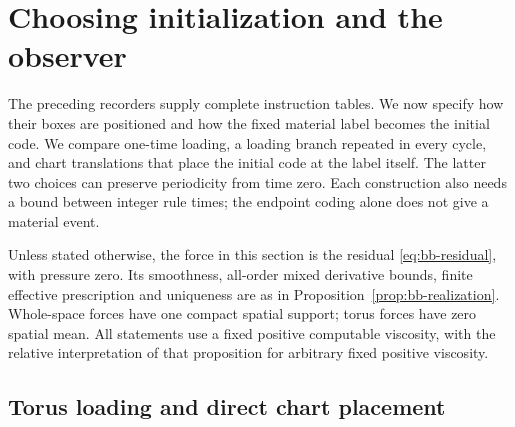 \section{Choosing initialization and the observer}
\label{sec:bb-initialization}

The preceding recorders supply complete instruction tables. We now
specify how their boxes are positioned and how the fixed material label
becomes the initial code. We compare one-time loading, a loading branch
repeated in every cycle, and chart translations that place the initial
code at the label itself. The latter two choices can preserve periodicity
from time zero. Each construction also needs a bound between integer
rule times; the endpoint coding alone does not give a material event.

Unless stated otherwise, the force in this section is the residual
\eqref{eq:bb-residual}, with pressure zero.  Its smoothness, all-order
mixed derivative bounds, finite effective prescription and uniqueness
are as in Proposition~\ref{prop:bb-realization}.  Whole-space forces
have one compact spatial support; torus forces have zero spatial mean.
All statements use a fixed positive computable viscosity, with the
relative interpretation of that proposition for arbitrary fixed
positive viscosity.

\subsection{Torus loading and direct chart placement}

